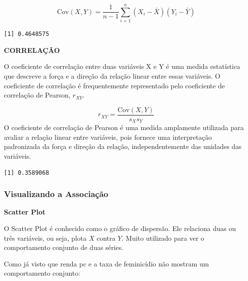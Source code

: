 \documentclass[
  letterpaper,
  DIV=11,
  numbers=noendperiod]{scrreprt}
\newenvironment{Shaded}{\begin{snugshade}}{\end{snugshade}}
\newcommand{\FunctionTok}[1]{\textcolor[rgb]{0.28,0.35,0.67}{#1}}
\newcommand{\NormalTok}[1]{\textcolor[rgb]{0.00,0.23,0.31}{#1}}
\newcommand{\SpecialCharTok}[1]{\textcolor[rgb]{0.37,0.37,0.37}{#1}}
\begin{document}
\[\text{Cov}(X, Y) = \frac{1}{n-1} \sum_{i=1}^{n} (X_i - \bar{X})(Y_i - \bar{Y})\]

\begin{Shaded}
\end{Shaded}

\begin{verbatim}
[1] 0.4648575
\end{verbatim}

\textbf{CORRELAÇÃO}

O coeficiente de correlação entre duas variáveis X e Y é uma medida
estatística que descreve a força e a direção da relação linear entre
essas variáveis. O coeficiente de correlação é frequentemente
representado pelo coeficiente de correlação de Pearson, \(r_{XY}\).

\[r_{XY} = \frac{\text{Cov}(X, Y)}{s_X s_Y}\] O coeficiente de
correlação de Pearson é uma medida amplamente utilizada para avaliar a
relação linear entre variáveis, pois fornece uma interpretação
padronizada da força e direção da relação, independentemente das
unidades das variáveis.

\begin{Shaded}
\end{Shaded}

\begin{verbatim}
[1] 0.3589068
\end{verbatim}

\subsubsection{Visualizando a
Associação}\label{visualizando-a-associauxe7uxe3o}

\textbf{Scatter Plot}

O Scatter Plot é conhecido como o gráfico de dispersão. Ele relaciona
duas ou três variáveis, ou seja, plota \(X\) contra \(Y\). Muito
utilizado para ver o comportamento conjunto de duas séries.

Como já visto que renda pc e a taxa de feminicídio não mostram um
comportamento conjunto:
\end{document}
